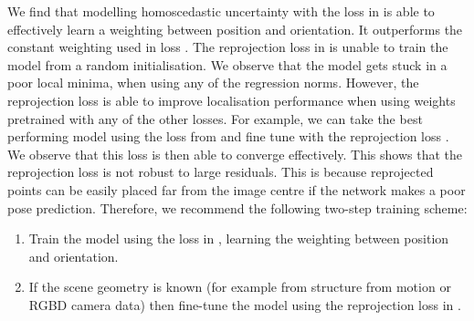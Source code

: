 We find that modelling homoscedastic uncertainty with the loss in  is able to effectively learn a weighting between position and orientation. It outperforms the constant weighting used in loss . The reprojection loss in  is unable to train the model from a random initialisation. We observe that the model gets stuck in a poor local minima, when using any of the regression norms. However, the reprojection loss is able to improve localisation performance when using weights pretrained with any of the other losses. For example, we can take the best performing model using the loss from  and fine tune with the reprojection loss . We observe that this loss is then able to converge effectively. This shows that the reprojection loss is not robust to large residuals. This is because reprojected points can be easily placed far from the image centre if the network makes a poor pose prediction. Therefore, we recommend the following two-step training scheme:
\begin{enumerate}
  \item Train the model using the loss in , learning the weighting between position and orientation.
  \item If the scene geometry is known (for example from structure from motion or RGBD camera data) then fine-tune the model using the reprojection loss in .
\end{enumerate}

